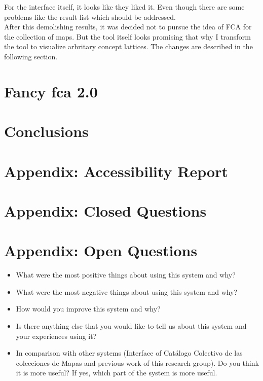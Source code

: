 \documentclass[11pt]{report}
\begin{document}
 For the interface itself, it looks like they liked it. Even though there are some problems like the result list which should be addressed. \\
 
 After this demolishing results, it was decided not to pursue the idea of FCA for the collection of maps. But the tool itself looks promising that why I transform the tool to visualize arbritary concept lattices. The changes are described in the following section.
 
\chapter{Fancy \acrshort{fca} 2.0}
\label{Fancy 2.0}

\blindtext

\chapter{Conclusions}
\label{Conclusions}

\blindtext

\newpage



\listoffigures
\listoftables 


\newpage
\appendix
\chapter{Appendix: Accessibility Report}
\label{app:access}



\chapter{Appendix: Closed Questions}
\label{app:closed}



\chapter{Appendix: Open Questions}
\label{app:open}

\begin{itemize}
	\item What were the most positive things about using this system and why?
	\item What were the most negative things about using this system and why?
	\item How would you improve this system and why?
	\item Is there anything else that you would like to tell us about this system and your experiences using it?
	\item In comparison with other systems (Interface of Catálogo Colectivo de las colecciones de Mapas and previous work of this research group).
Do you think it is more useful? If yes, which part of the system is more useful.
\end{itemize}
\end{document}

